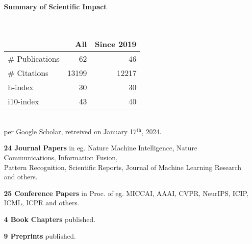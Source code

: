 \headedsection %
{\bf Summary of Scientific Impact}{}{}
{
    \qquad~~~~
    \begin{minipage}[t]{0.6\textwidth}
        \begin{tabular}{lrr}
        \hline
         & All & Since 2019\\
        \hline
        \# Publications & 62     & 46    \\
        \# Citations    & 13199  & 12217 \\
        h-index         & 30     & 30    \\
        i10-index       & 43     & 40    \\
        \hline
    \end{tabular}
    \\
    {\footnotesize{
        per \href{https://scholar.google.com/citations?user=wpLQuroAAAAJ}{Google Scholar},
        retreived on January 17$^\text{th}$, 2024.
        }
    }
    \end{minipage}

    \ifdefined\shortcv
        \vstep
        {\bf 24 Journal Papers} in eg. Nature Machine Intelligence, Nature Communications, Information Fusion,\\
        \hspace*{\fill} Pattern Recognition, Scientific Reports, Journal of Machine Learning Research and others.

        {\bf 25 Conference Papers} in Proc. of eg. MICCAI, AAAI, CVPR, NeurIPS, ICIP, ICML, ICPR and others.

        {\bf 4 Book Chapters} published.

        {\bf 9 Preprints} published.
        
    \else
        {}
    \fi

}
